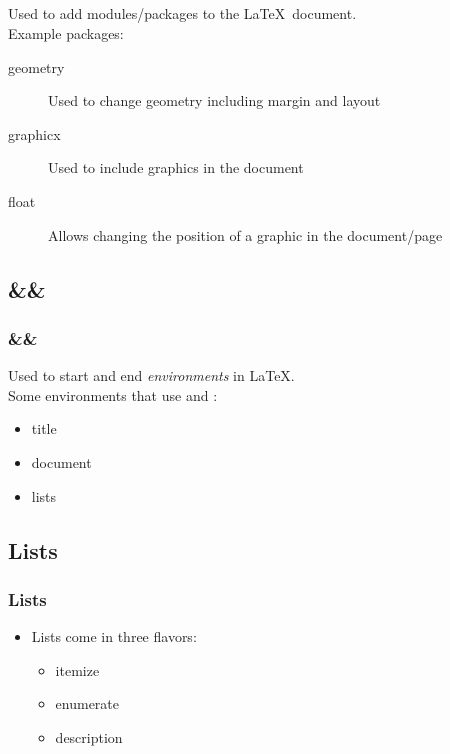 \subsection{}

\begin{frame}
\frametitle{}
    Used to add modules/packages to the \LaTeX\ document.\\
    Example packages:
    \begin{description}
        \item[geometry] Used to change geometry including margin and layout
        \item[graphicx] Used to include graphics in the document
        \item[float] Allows changing the position of a graphic in the document/page
    \end{description}
\end{frame}



\subsection{ \&\& }

\begin{frame}
\frametitle{ \&\& }
    Used to start and end \textit{environments} in \LaTeX .\\
    Some environments that use  and 
    :
    \begin{itemize}
        \item title
        \item document
        \item lists
    \end{itemize}
\end{frame}



\subsection{Lists}

\begin{frame}
\frametitle{Lists}
    \begin{itemize}
        \item Lists come in three flavors:
        \begin{itemize}
            \item itemize
            \item enumerate
            \item description
        \end{itemize}
    \end{itemize}
\end{frame}



